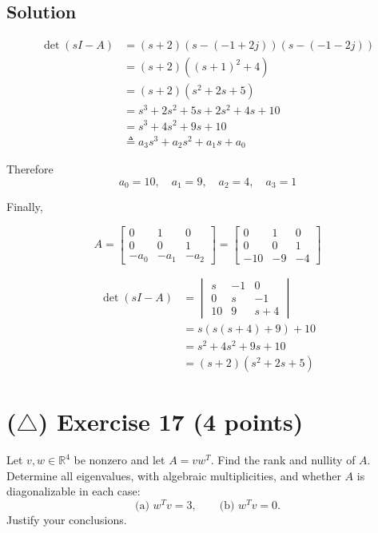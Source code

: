 \documentclass[12pt,a4paper]{article}
\begin{document}
\subsection*{Solution}

\begin{align*}
	\det (sI - A) &= (s + 2) (s - (-1 + 2j)) (s - (-1 - 2j)) \\
	&= (s + 2) ( (s + 1)^2 + 4 ) \\
	&= (s + 2) ( s^2 + 2s + 5) \\
	&= s^3 + 2s^2 + 5s + 2s^2 + 4s + 10  \\
	&= s^3 + 4s^2 + 9s + 10\\
	&\triangleq a_3 s^3 + a_2 s^2 + a_1 s + a_0
\end{align*}

Therefore 
\[
a_0 = 10, \quad a_1 = 9, \quad a_2 = 4, \quad a_3 = 1
\]

Finally, 

\[
A = \begin{bmatrix}
	0 & 1 & 0 \\
	0 & 0 & 1 \\
	-a_0 & -a_1 & -a_2
\end{bmatrix} = \begin{bmatrix}
	0 & 1 & 0 \\
0 & 0 & 1 \\
-10 & -9 & -4
\end{bmatrix}
\]

\begin{align*}
\det (sI - A) &= \begin{vmatrix}
	s & -1 & 0 \\
	0 & s & -1 \\
	10 & 9 & s + 4
\end{vmatrix} \\&= s (s(s + 4) + 9) + 10 \\
&= s^2 + 4s^2 + 9s + 10 \\
&= (s + 2)(s^2+ 2s +   5) 
\end{align*}

\vspace{3cm}
\clearpage
\section*{($\triangle$) Exercise 17 \hfill {\normalsize (4 points)}}
Let $v,w\in\mathbb R^4$ be nonzero and let $A=vw^T$. Find the rank and nullity of $A$. Determine all eigenvalues, with algebraic multiplicities, and whether $A$ is diagonalizable in each case:
\[
\text{(a) }w^Tv=3,\qquad \text{(b) }w^Tv=0.
\]
Justify your conclusions.
\end{document}
